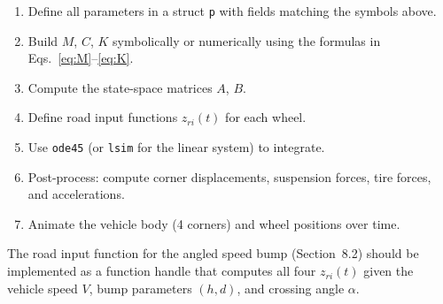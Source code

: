 \documentclass[11pt]{article}
\def\vect#1{#1}%
\newcommand{\vect}[1]{\bm{#1}}
\begin{document}
\begin{enumerate}
  \item Define all parameters in a struct \texttt{p} with fields matching the symbols above.
  \item Build $\vect{M}$, $\vect{C}$, $\vect{K}$ symbolically or numerically using the formulas in Eqs.~\eqref{eq:M}--\eqref{eq:K}.
  \item Compute the state-space matrices $\vect{A}$, $\vect{B}$.
  \item Define road input functions $z_{ri}(t)$ for each wheel.
  \item Use \texttt{ode45} (or \texttt{lsim} for the linear system) to integrate.
  \item Post-process: compute corner displacements, suspension forces, tire forces, and accelerations.
  \item Animate the vehicle body (4 corners) and wheel positions over time.
\end{enumerate}

The road input function for the angled speed bump (Section~8.2) should be implemented as a function handle that computes all four $z_{ri}(t)$ given the vehicle speed $V$, bump parameters $(h, d)$, and crossing angle $\alpha$.
\end{document}
